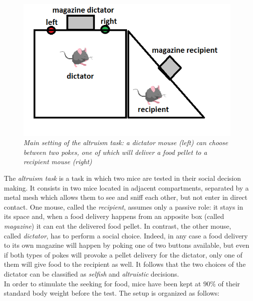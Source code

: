 \documentclass[12pt, a4paper]{article}
\begin{document}
\begin{figure}[H]
	\begin{center}
		\includegraphics[scale=1.1]{altruism.png} 
	\end{center} 
	\caption{\textit{Main setting of the altruism task: a dictator mouse (left) can choose between two pokes, one of which will deliver a food pellet to a recipient mouse (right)}} \label{altruism}
	
\end{figure}

The \textit{altruism task} is a task in which two mice are tested in their social decision making. It consists in two mice located in adjacent compartments, separated by a metal mesh which allows them to see and sniff each other, but not enter in direct contact. One mouse, called the \textit{recipient}, assumes only a passive role: it stays in its space and, when a food delivery happens from an apposite box (called \textit{magazine}) it can eat the delivered food pellet. 
In contrast, the other mouse, called \textit{dictator}, has to perform a social choice. Indeed, in any case a food delivery to its own magazine will happen by poking one of two buttons available, but even if both types of pokes will provoke a pellet delivery for the dictator, only one of them will give food to the recipient as well. It follows that the two choices of the dictator can be classified as \textit{selfish} and \textit{altruistic} decisions.\\
In order to stimulate the seeking for food, mice have been kept at $ 90 \%$ of their standard body weight before the test. The setup is organized as follows:
\end{document}
